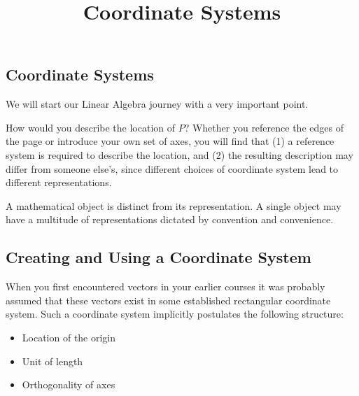 \documentclass{ximera}
\title{Coordinate Systems} \license{CC BY-NC-SA 4.0}
\begin{document}
\begin{abstract}
\end{abstract}
\maketitle

\begin{onlineOnly}
\section*{Coordinate Systems}
\end{onlineOnly}
We will start our Linear Algebra journey with a very important point.  

\begin{center}
\end{center}       

How would you describe the location of $P$?  Whether you reference the edges of the page or introduce your own set of axes, you will find that (1) a reference system is required to describe the location, and (2) the resulting description may differ from someone else’s, since different choices of coordinate system lead to different representations.

\begin{idea}
A mathematical object is distinct from its representation.  A single object may have a multitude of representations dictated by convention and convenience.
\end{idea}

\subsection*{Creating and Using a Coordinate System}

When you first encountered vectors in your earlier courses it was probably assumed that these vectors exist in some established rectangular coordinate system.  Such a coordinate system implicitly postulates the following structure:
\begin{itemize}
    \item Location of the origin
    \item Unit of length
    \item Orthogonality of axes
\end{itemize}
\end{document}
